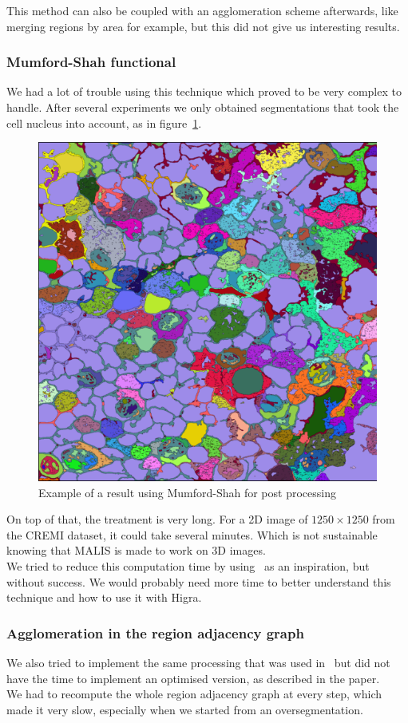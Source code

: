 This method can also be coupled with an agglomeration scheme afterwards, like
merging regions by area for example, but this did not give us interesting
results.

\subsubsection{Mumford-Shah functional}

We had a lot of trouble using this technique which proved to be very complex to
handle. After several experiments we only obtained segmentations that took the
cell nucleus into account, as in figure~\ref{fig:mumford-shah}.

\begin{figure}[!htbp]
	\centering
	\includegraphics[width=0.3\linewidth]{./images/mumford_shah.png}
	\caption{Example of a result using Mumford-Shah for post processing}%
	\label{fig:mumford-shah}
\end{figure}

On top of that, the treatment is very long. For a 2D image of $1250\times1250$ from the
CREMI dataset,  it could take several minutes. Which is not sustainable knowing that
MALIS is made to work on 3D images.\\

We tried to reduce this computation time by
using~\cite{perret_removing_2019}
as an inspiration, but without success. We would probably need more time to
better understand this technique and how to use it with Higra.


\subsubsection{Agglomeration in the region adjacency graph}

We also tried to implement the same processing that was used
in~\cite{funke_large_2019} but did not have the time to implement an optimised
version, as described in the paper.\\
We had to recompute the whole region adjacency graph at every step, which made
it very slow, especially when we started from an oversegmentation.\\

